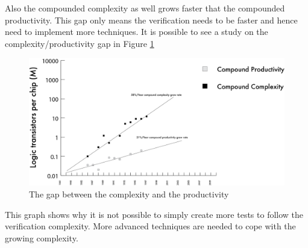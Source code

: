 Also the compounded complexity as well grows faster that the compounded productivity. This gap only means the verification needs to be faster and hence need to implement more techniques.
It is possible to see a study on the complexity/productivity gap in Figure \ref{complexity-gap}
\begin{figure}[H]
    \centering
    \includegraphics[scale = 0.4]{Chapter_1/img/prod-compl.png}
    \caption{The gap between the complexity and the productivity \cite{verification-book-2018}}
    \label{complexity-gap}
\end{figure}

This graph shows why it is not possible to simply create more tests to follow the verification complexity. More advanced techniques are needed to cope with the growing complexity.

